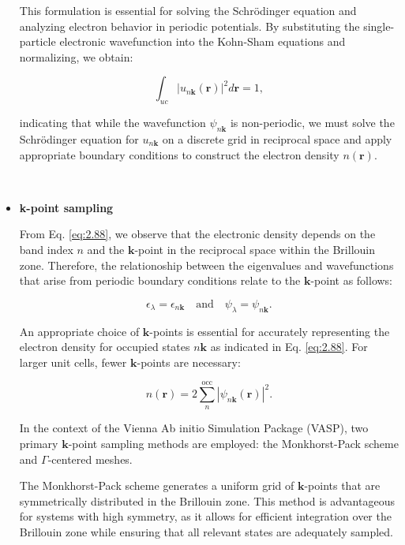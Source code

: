 \begin{itemize}
	This formulation is essential for solving the Schrödinger equation and analyzing electron behavior in periodic potentials. By substituting the single-particle electronic wavefunction into the Kohn-Sham equations and normalizing, we obtain:  
	
	\begin{equation}  
		\int_{uc} | u_{n \mathbf{k}}(\mathbf{r})|^{2} d \mathbf{r} = 1,  
		\label{eq:2.88}  
	\end{equation}  
	
	indicating that while the wavefunction $\psi_{n\mathbf{k}}$ is non-periodic, we must solve the Schrödinger equation for $u_{n\mathbf{k}}$ on a discrete grid in reciprocal space and apply appropriate boundary conditions to construct the electron density $n(\mathbf{r})$.  

\
\item \textbf{k-point sampling}

From Eq. \ref{eq:2.88}, we observe that the electronic density depends on the band index \(n\) and the \(\mathbf{k}\)-point in the reciprocal space within the Brillouin zone. Therefore, the relationoship between the  eigenvalues and wavefunctions that arise from periodic boundary conditions relate to the \(\mathbf{k}\)-point as follows:

\begin{equation}
	\epsilon_{\lambda} = \epsilon_{n \mathbf{k}} \quad \text{and} \quad \psi_{\lambda} = \psi_{n \mathbf{k}}.
\end{equation}

An appropriate choice of \(\mathbf{k}\)-points is essential for accurately representing the electron density for occupied states \(n \mathbf{k}\) as indicated in Eq. \ref{eq:2.88}. For larger unit cells, fewer \(\mathbf{k}\)-points are necessary:

\begin{equation}
	n(\mathbf{r}) = 2 \sum_{n}^{\text{occ}} |\psi_{n \mathbf{k}}(\mathbf{r})|^{2}.
\end{equation}

In the context of the Vienna Ab initio Simulation Package (VASP), two primary \(\mathbf{k}\)-point sampling methods are employed: the Monkhorst-Pack scheme and \(\Gamma\)-centered meshes.

The Monkhorst-Pack scheme generates a uniform grid of \(\mathbf{k}\)-points that are symmetrically distributed in the Brillouin zone. This method is advantageous for systems with high symmetry, as it allows for efficient integration over the Brillouin zone while ensuring that all relevant states are adequately sampled.


\end{itemize}
